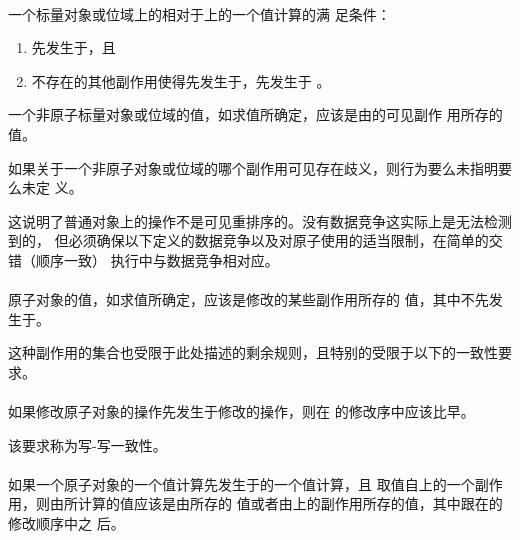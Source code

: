 \paragraph{} %
一个标量对象或位域上的相对于上的一个值计算的满
足条件：
\begin{enumerate}
  \item {}先发生于，且
  \item 不存在的其他副作用使得先发生于，先发生于
        。
\end{enumerate}
一个非原子标量对象或位域的值，如求值所确定，应该是由的可见副作
用所存的值。

\begin{note}
  如果关于一个非原子对象或位域的哪个副作用可见存在歧义，则行为要么未指明要么未定
  义。
\end{note}

\begin{note}
  这说明了普通对象上的操作不是可见重排序的。没有数据竞争这实际上是无法检测到的，
  但必须确保以下定义的数据竞争以及对原子使用的适当限制，在简单的交错（顺序一致）
  执行中与数据竞争相对应。
\end{note}

\paragraph{} %
原子对象的值，如求值所确定，应该是修改的某些副作用所存的
值，其中不先发生于。

\begin{note}
  这种副作用的集合也受限于此处描述的剩余规则，且特别的受限于以下的一致性要求。
\end{note}

\paragraph{} %
如果修改原子对象的操作先发生于修改的操作，则在
的修改序中应该比早。

\begin{note}
  该要求称为写-写一致性。
\end{note}

\paragraph{} %
如果一个原子对象的一个值计算先发生于的一个值计算，且
取值自上的一个副作用，则由所计算的值应该是由所存的
值或者由上的副作用所存的值，其中跟在的修改顺序中之
后。


